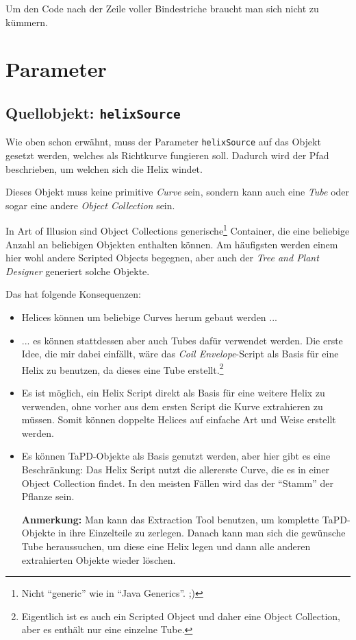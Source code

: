 \documentclass[12pt,a4paper]{scrartcl}
\begin{document}
Um den Code nach der Zeile voller Bindestriche braucht man sich nicht
zu kümmern.

\section{Parameter}
\subsection{Quellobjekt: \texttt{helixSource}}
Wie oben schon erwähnt, muss der Parameter \texttt{helixSource} auf das
Objekt gesetzt werden, welches als Richtkurve fungieren soll. Dadurch
wird der Pfad beschrieben, um welchen sich die Helix windet.

Dieses Objekt muss keine primitive \emph{Curve} sein, sondern kann auch
eine \emph{Tube} oder sogar eine andere \emph{Object Collection} sein.

In Art of Illusion sind Object Collections generische\footnote{Nicht
``generic'' wie in ``Java Generics''. ;)} Container, die eine beliebige
Anzahl an beliebigen Objekten enthalten können. Am häufigsten werden 
einem hier wohl andere Scripted Objects begegnen, aber auch der
\emph{Tree and Plant Designer} generiert solche Objekte.

Das hat folgende Konsequenzen:
\begin{itemize}
	\item Helices können um beliebige Curves herum gebaut werden ...
	\item ... es können stattdessen aber auch Tubes dafür verwendet
		werden. Die erste Idee, die mir dabei einfällt, wäre das 
		\emph{Coil Envelope}-Script als Basis für eine Helix zu benutzen,
		da dieses eine Tube erstellt.\footnote{Eigentlich ist es auch
		ein Scripted Object und daher eine Object Collection, aber es enthält
		nur eine einzelne Tube.}
	\item Es ist möglich, ein Helix Script direkt als Basis für eine weitere
		Helix zu verwenden, ohne vorher aus dem ersten Script die Kurve
		extrahieren zu müssen. Somit können doppelte Helices auf einfache Art
		und Weise erstellt werden.
	\item Es können TaPD-Objekte als Basis genutzt werden, aber hier gibt es
		eine Beschränkung: Das Helix Script nutzt die allererste Curve, die es
		in einer Object Collection findet. In den meisten Fällen wird das der
		``Stamm'' der Pflanze sein.
		
		\textbf{Anmerkung:} Man kann das Extraction Tool benutzen, um komplette
		TaPD-Objekte in ihre Einzelteile zu zerlegen. Danach kann man sich die
		gewünsche Tube heraussuchen, um diese eine Helix legen und dann alle
		anderen extrahierten Objekte wieder löschen.
\end{itemize}
\end{document}
